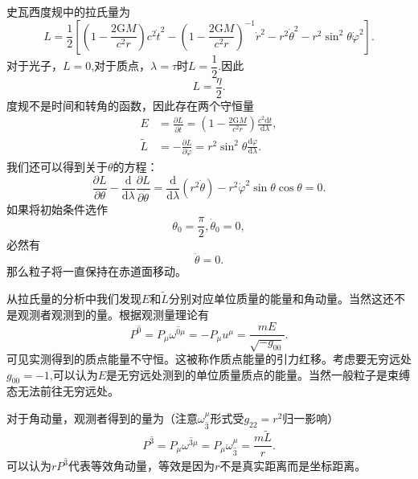 \documentclass[11pt, a4paper, oneside, onecolumn]{ctexart}
\numberwithin{equation}{subsection}
\begin{document}
史瓦西度规中的拉氏量为
\begin{equation}
L=\frac12\left[\left(1-\frac{2\mathrm{G}M}{c^{2}r}\right)c^{2}\dot{t}^{2}-\left(1-\frac{2\mathrm{G}M}{c^{2}r}\right)^{-1}\dot{r}^{2}-r^{2}\dot{\theta}^{2}-r^{2}\sin^{2}\theta\dot{\varphi}^{2}\right].
\end{equation}
对于光子，$L=0$,对于质点，$\lambda=\tau$时$L=\dfrac12$.因此
\begin{equation}
L=\frac{\eta}{2}.
\end{equation}
度规不是时间和转角的函数，因此存在两个守恒量
\begin{align}
E&=\frac{\partial{}L}{\partial{}\dot{t}}=\left(1-\frac{2\mathrm{G}M}{c^{2}r}\right)\frac{c^{2}\mathrm{d}t}{\mathrm{d}\lambda},\\
\widetilde{L}&=-\frac{\partial{}L}{\partial{}\dot{\varphi}}=r^{2}\sin^{2}\theta\frac{\mathrm{d}\varphi}{\mathrm{d}\lambda}.
\end{align}
我们还可以得到关于$\theta$的方程：
\begin{equation}
\frac{\partial{}L}{\partial{}\theta}-\frac{\mathrm{d}}{\mathrm{d}\lambda}\frac{\partial{}L}{\partial{}\dot{\theta}}=\frac{\mathrm{d}}{\mathrm{d}\lambda}\left(r^{2}\dot{\theta}\right)-r^{2}\dot{\varphi}^{2}\sin\theta\cos\theta=0.
\end{equation}
如果将初始条件选作
\begin{equation}
\theta_{0}=\frac{\pi}{2},\dot{\theta}_{0}=0,
\end{equation}
必然有
\begin{equation}
\ddot{\theta}=0.
\end{equation}
那么粒子将一直保持在赤道面移动。

\newpage
从拉氏量的分析中我们发现$E$和$\widetilde{L}$分别对应单位质量的能量和角动量。当然这还不是观测者观测到的量。根据观测量理论有
\begin{equation}
P^{\hat{0}}=P_{\mu}\omega^{\hat{0}\mu}=-P_{\mu}u^{\mu}=\frac{mE}{\sqrt{-g_{00}}}.
\end{equation}
可见实测得到的质点能量不守恒。这被称作质点能量的引力红移。考虑要无穷远处$g_{00}=-1$,可以认为$E$是无穷远处测到的单位质量质点的能量。当然一般粒子是束缚态无法前往无穷远处。

对于角动量，观测者得到的量为（注意$\omega_{\hat{3}}^{\mu}$形式受$g_{22}=r^{2}$归一影响）
\begin{equation}
P^{\hat{3}}=P_{\mu}\omega^{\hat{3}\mu}=P_{\mu}\omega^{\mu}_{\hat{3}}=\frac{m\widetilde{L}}{r}.
\end{equation}
可以认为$r P^{\hat{3}}$代表等效角动量，等效是因为$r$不是真实距离而是坐标距离。
\end{document}
